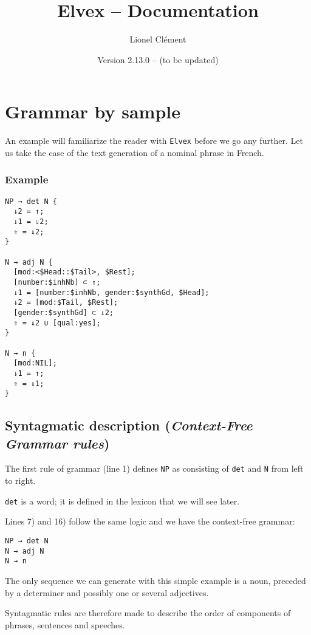 \documentclass[11pt]{article}
\title{Elvex -- Documentation}
\author{Lionel Clément}
\date{Version 2.13.0 --  (to be updated)}
\begin{document}
\maketitle



\section{Grammar by sample}

An example will familiarize the reader with \texttt{Elvex} before we
go any further. Let us take the case of the text generation of a
nominal phrase in French.

\subsubsection*{Example}

\begin{lstlisting}
NP → det N {
  ↓2 = ↑;
  ↓1 = ⇓2;
  ⇑ = ⇓2;
}

N → adj N {
  [mod:<$Head::$Tail>, $Rest];
  [number:$inhNb] ⊂ ↑;
  ↓1 = [number:$inhNb, gender:$synthGd, $Head];
  ↓2 = [mod:$Tail, $Rest];
  [gender:$synthGd] ⊂ ⇓2;
  ⇑ = ⇓2 ∪ [qual:yes];
}

N → n {
  [mod:NIL];
  ↓1 = ↑;
  ⇑ = ⇓1;
}
\end{lstlisting}

\subsection{Syntagmatic description (\textit{Context-Free Grammar rules})}
 
The first rule of grammar (line 1) defines \texttt{NP} as
consisting of \texttt{det} and \texttt{N} from left to right.

\texttt{det} is a word; it is defined in the lexicon that we will see
later.

Lines 7) and 16) follow the same logic and we have the
context-free grammar:

\begin{lstlisting}[numbers=none]
NP → det N
N → adj N
N → n
\end{lstlisting}

The only sequence we can generate with this simple example is
a noun, preceded by a determiner and possibly one or several adjectives.

Syntagmatic rules are therefore made to describe the order of
components of phrases, sentences and speeches.
\end{document}
